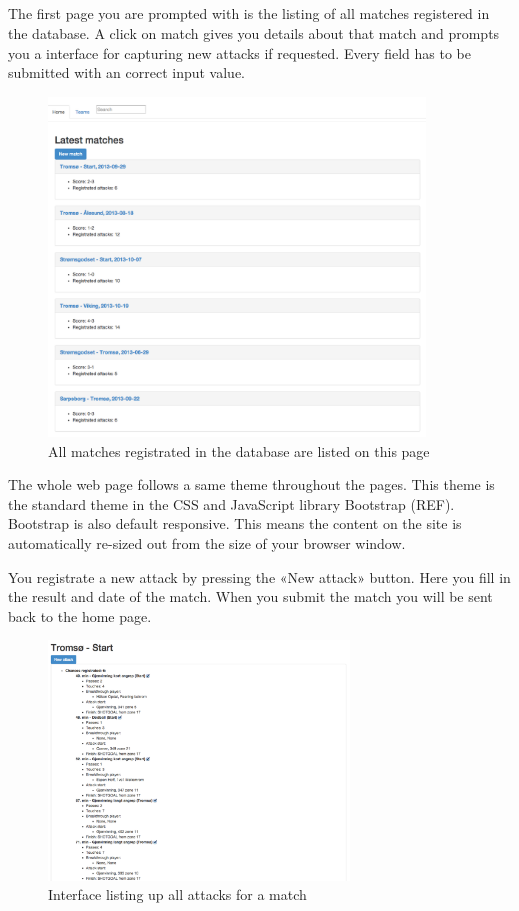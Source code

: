 \subsection{}

The first page you are prompted with is the listing of all matches registered in the database. A click on match gives you details about that match and prompts you a interface for capturing new attacks if requested. Every field has to be submitted with an correct input value.

\begin{figure}[ht!]
\centering
\includegraphics[width=100mm]{images/general/all_matches.png}
\caption{All matches registrated in the database are listed on this page}
\label{overflow}
\end{figure}


The whole web page follows a same theme throughout the pages. This theme is the standard theme in the CSS and JavaScript library Bootstrap (REF).  Bootstrap is also default responsive. This means the content on the site is automatically re-sized out from the size of your browser window.

You registrate a new attack by pressing the «New attack» button.  Here you fill in the result and date of the match.  When you submit the match you will be sent back to the home page. 

\begin{figure}[ht!]
\centering
\includegraphics[width=80mm]{images/general/all_attacks.png}
\caption{Interface listing up all attacks for a match}
\label{overflow}
\end{figure}


